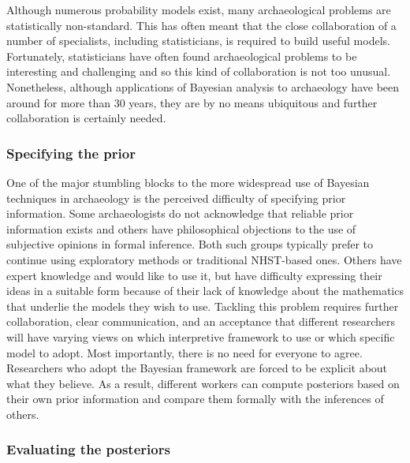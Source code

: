\documentclass[
]{article}
\begin{document}
Although numerous probability models exist, many archaeological problems
are statistically non-standard. This has often meant that the close
collaboration of a number of specialists, including statisticians, is
required to build useful models. Fortunately, statisticians have often
found archaeological problems to be interesting and challenging and so
this kind of collaboration is not too unusual. Nonetheless, although
applications of Bayesian analysis to archaeology have been around for
more than 30 years, they are by no means ubiquitous and further
collaboration is certainly needed.

\hypertarget{specifying-the-prior}{%
\subsubsection{Specifying the prior}\label{specifying-the-prior}}

One of the major stumbling blocks to the more widespread use of Bayesian
techniques in archaeology is the perceived difficulty of specifying
prior information. Some archaeologists do not acknowledge that reliable
prior information exists and others have philosophical objections to the
use of subjective opinions in formal inference. Both such groups
typically prefer to continue using exploratory methods or traditional
NHST-based ones. Others have expert knowledge and would like to use it,
but have difficulty expressing their ideas in a suitable form because of
their lack of knowledge about the mathematics that underlie the models
they wish to use. Tackling this problem requires further collaboration,
clear communication, and an acceptance that different researchers will
have varying views on which interpretive framework to use or which
specific model to adopt. Most importantly, there is no need for everyone
to agree. Researchers who adopt the Bayesian framework are forced to be
explicit about what they believe. As a result, different workers can
compute posteriors based on their own prior information and compare them
formally with the inferences of others.

\hypertarget{evaluating-the-posteriors}{%
\subsubsection{Evaluating the
posteriors}\label{evaluating-the-posteriors}}
\end{document}
